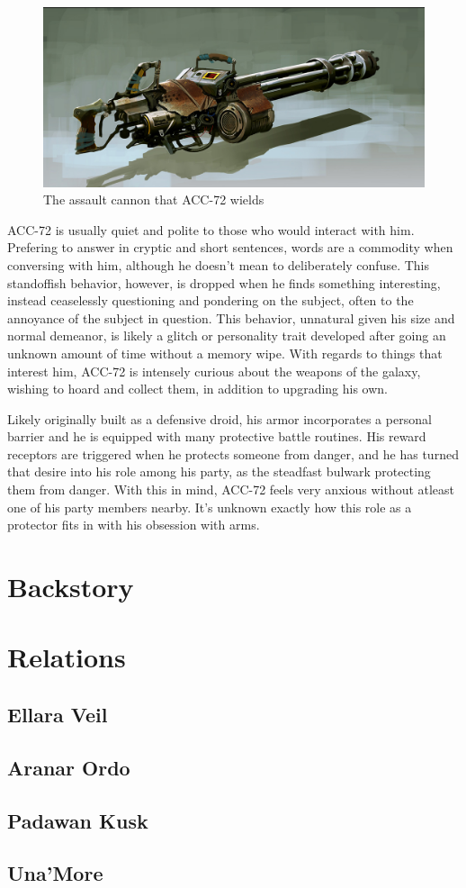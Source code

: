 \documentclass[12pt]{article}
\begin{document}
\begin{figure}[!htb]
  \centering
  \includegraphics[width=.7\textwidth]{./resources/assaultcannon}
  \caption{The assault cannon that ACC-72 wields}
\end{figure}

ACC-72 is usually quiet and polite to those who would interact with him.
Prefering to answer in cryptic and short sentences, words are a commodity when
conversing with him, although he doesn't mean to deliberately confuse. 
This standoffish behavior, however, is dropped when he finds something
interesting, instead ceaselessly questioning and pondering on the subject, often
to the annoyance of the subject in question. 
This behavior, unnatural given his size and normal demeanor, is likely a glitch
or personality trait developed after going an unknown amount of time without
a memory wipe. 
With regards to things that interest him, ACC-72 is intensely curious about the
weapons of the galaxy, wishing to hoard and collect them, in addition to
upgrading his own.

Likely originally built as a defensive droid, his armor incorporates a personal
barrier and he is equipped with many protective battle routines. 
His reward receptors are triggered when he protects someone from danger, and he
has turned that desire into his role among his party, as the steadfast bulwark
protecting them from danger. With this in mind, ACC-72 feels very anxious
without atleast one of his party members nearby. 
It's unknown exactly how this role as a protector fits in with his obsession
with arms.

\section{Backstory}

\section{Relations}

\subsection{Ellara Veil}

\subsection{Aranar Ordo}

\subsection{Padawan Kusk}

\subsection{Una'More}
\end{document}
